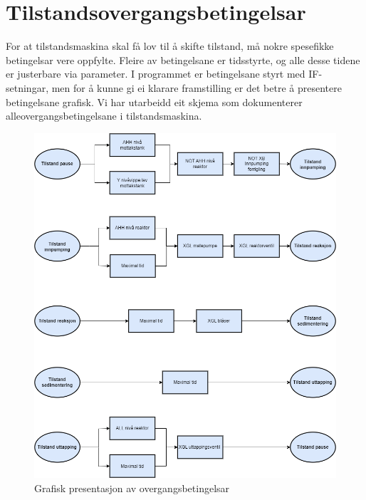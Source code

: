 \section{Tilstandsovergangsbetingelsar}
\thispagestyle{fancy}

For at tilstandsmaskina skal få lov til å skifte tilstand, må nokre spesefikke betingelsar vere oppfylte.
Fleire av betingelsane er tidsstyrte, og alle desse tidene er justerbare via parameter.\newline
I programmet er betingelsane styrt med IF-setningar, men for å kunne gi ei klarare framstilling er det betre å presentere betingelsane grafisk.
Vi har utarbeidd eit skjema som dokumenterer alle\newline overgangsbetingelsane i tilstandsmaskina.\newline \newline

\begin{figure}[htbp]
    \centering
    \includegraphics[scale=0.5]{Figurar/Tilstandsovergang.drawio.png}
    \caption{Grafisk presentasjon av overgangsbetingelsar}\label{fig:Tilstandsovergangsbetingelsar}
\end{figure}

\newpage